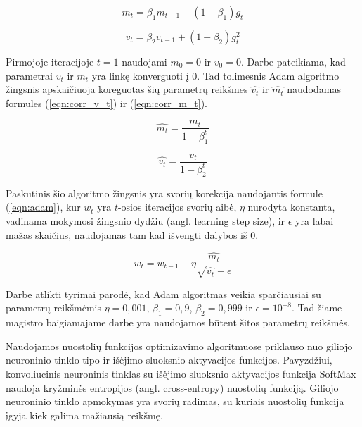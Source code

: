 \begin{equation}
\label{eqn:m_t}
	m_t = \beta_1 m_{t-1} + (1 - \beta_1)g_t
\end{equation}

\begin{equation}
\label{eqn:v_t}
	v_t = \beta_2 v_{t-1} + (1 - \beta_2)g_t^2
\end{equation}

Pirmojoje iteracijoje $t = 1$ naudojami $m_0 = 0$ ir $v_0 = 0$. Darbe \cite{adam} pateikiama, kad parametrai $v_t$ ir $m_t$ yra linkę konverguoti į 0. Tad tolimesnis Adam algoritmo žingsnis apskaičiuoja koreguotas šių parametrų reikšmes $\hat{v_t}$ ir $\hat{m_t}$ naudodamas formules (\ref{eqn:corr_v_t}) ir (\ref{eqn:corr_m_t}).

\begin{equation}
\label{eqn:corr_m_t}
	\hat{m_t} = \dfrac{m_t}{1 - \beta_1^t}
\end{equation}

\begin{equation}
\label{eqn:corr_v_t}
	\hat{v_t} = \dfrac{v_t}{1 - \beta_2^t}
\end{equation}

Paskutinis šio algoritmo žingsnis yra svorių korekcija naudojantis formule (\ref{eqn:adam}), kur $w_t$ yra $t$-osios iteracijos svorių aibė, $\eta$ nurodyta konstanta, vadinama mokymosi žingsnio dydžiu (angl. learning step size), ir $\epsilon$ yra labai mažas skaičius, naudojamas tam kad išvengti dalybos iš 0.

\begin{equation}
\label{eqn:adam}
	w_t = w_{t-1} - \eta \dfrac{\hat{m_t}}{\sqrt{\hat{v_t}} + \epsilon}
\end{equation}

Darbe \cite{adam} atlikti tyrimai parodė, kad Adam algoritmas veikia sparčiausiai su parametrų reikšmėmis $\eta = 0,001$, $\beta_1 = 0,9$, $\beta_2 = 0,999$ ir $\epsilon = 10^{-8}$. Tad šiame magistro baigiamajame darbe yra naudojamos būtent šitos parametrų reikšmės.

Naudojamos nuostolių funkcijos optimizavimo algoritmuose priklauso nuo giliojo neuroninio tinklo tipo ir išėjimo sluoksnio aktyvacijos funkcijos. Pavyzdžiui, konvoliucinis neuroninis tinklas su išėjimo sluoksnio aktyvacijos funkcija SoftMax naudoja kryžminės entropijos (angl. cross-entropy) nuostolių funkciją. Giliojo neuroninio tinklo apmokymas yra svorių radimas, su kuriais nuostolių funkcija įgyja kiek galima mažiausią reikšmę.
